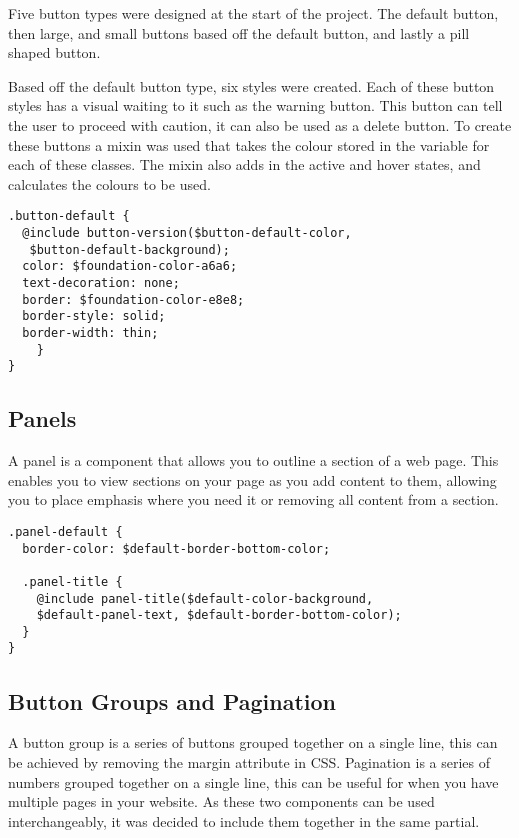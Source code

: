 Five button types were designed at the start of the project. The default button, then large, and small buttons based off the default button, and lastly a pill shaped button. 

Based off the default button type, six styles were created. Each of these button styles has a visual waiting to it such as the warning button. This button can tell the user to proceed with caution, it can also be used as a delete button. To create these buttons a mixin was used that takes the colour stored in the variable for each of these classes. The mixin also adds in the active and hover states, and calculates the colours to be used. 

\begin{lstlisting}[language=CSS3]
.button-default {
  @include button-version($button-default-color,
   $button-default-background);
  color: $foundation-color-a6a6;
  text-decoration: none;
  border: $foundation-color-e8e8;
  border-style: solid;
  border-width: thin;
	}
}
\end{lstlisting}

\subsection*{Panels}
A panel is a component that allows you to outline a section of a web page. This enables you to view sections on your page as you add content to them, allowing you to place emphasis where you need it or removing all content from a section. 

\begin{lstlisting}[language=CSS3]
.panel-default {
  border-color: $default-border-bottom-color;

  .panel-title {
    @include panel-title($default-color-background, 
    $default-panel-text, $default-border-bottom-color);
  }
}
\end{lstlisting}

\newpage
\subsection*{Button Groups and Pagination}
A button group is a series of buttons grouped together on a single line, this can be achieved by removing the margin attribute in CSS. Pagination is a series of numbers grouped together on a single line, this can be useful for when you have multiple pages in your website. As these two components can be used interchangeably, it was decided to include them together in the same partial.


